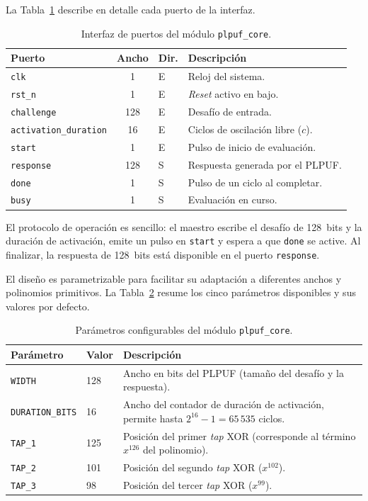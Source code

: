 La Tabla~\ref{tab:plpuf_ports} describe en detalle cada puerto de la
interfaz.

\begin{table}[htbp]
\centering
\caption{Interfaz de puertos del módulo \texttt{plpuf\_core}.}
\label{tab:plpuf_ports}
\begin{tabular}{lclp{7cm}}
\hline
\textbf{Puerto} & \textbf{Ancho} & \textbf{Dir.} & \textbf{Descripción} \\
\hline
\texttt{clk}                  & 1   & E & Reloj del sistema. \\
\texttt{rst\_n}               & 1   & E & \textit{Reset} activo en bajo. \\
\texttt{challenge}            & 128 & E & Desafío de entrada. \\
\texttt{activation\_duration} & 16  & E & Ciclos de oscilación libre ($c$). \\
\texttt{start}                & 1   & E & Pulso de inicio de evaluación. \\
\texttt{response}             & 128 & S & Respuesta generada por el PLPUF. \\
\texttt{done}                 & 1   & S & Pulso de un ciclo al completar. \\
\texttt{busy}                 & 1   & S & Evaluación en curso. \\
\hline
\end{tabular}
\end{table}

El protocolo de operación es sencillo: el maestro escribe el desafío de
128~bits y la duración de activación, emite un pulso en \texttt{start} y
espera a que \texttt{done} se active. Al finalizar, la respuesta de
128~bits está disponible en el puerto \texttt{response}.

El diseño es parametrizable para facilitar su adaptación a diferentes anchos
y polinomios primitivos. La Tabla~\ref{tab:params} resume los cinco
parámetros disponibles y sus valores por defecto.

\begin{table}[htbp]
\centering
\caption{Parámetros configurables del módulo \texttt{plpuf\_core}.}
\label{tab:params}
\begin{tabular}{llp{7cm}}
\hline
\textbf{Parámetro} & \textbf{Valor} & \textbf{Descripción} \\
\hline
\texttt{WIDTH}          & 128 & Ancho en bits del PLPUF (tamaño del desafío y la respuesta). \\
\texttt{DURATION\_BITS} & 16  & Ancho del contador de duración de activación, permite hasta $2^{16}-1 = 65\,535$ ciclos. \\
\texttt{TAP\_1}         & 125 & Posición del primer \textit{tap} XOR (corresponde al término $x^{126}$ del polinomio). \\
\texttt{TAP\_2}         & 101 & Posición del segundo \textit{tap} XOR ($x^{102}$). \\
\texttt{TAP\_3}         & 98  & Posición del tercer \textit{tap} XOR ($x^{99}$). \\
\hline
\end{tabular}
\end{table}

